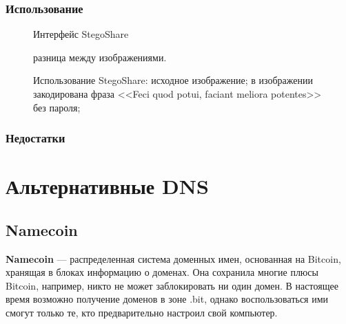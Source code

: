\subsubsection{Использование}
\begin{figure}[h]
\caption{Интерфейс StegoShare}
\end{figure}
\begin{figure}[ht!]
\vspace{-4ex}
\centering
{}
\hspace{4ex}
\hspace{4ex}
\caption{Использование StegoShare:
 исходное изображение;
 в изображении закодирована фраза <<Feci quod potui, faciant meliora potentes>> без пароля;
} разница между изображениями.
\end{figure}
\subsubsection{Недостатки}

\section{Альтернативные DNS}
\subsection{Namecoin}
\textbf{Namecoin} --- распределенная система доменных имен, основанная на Bitcoin, хранящая в блоках информацию о доменах. Она сохранила многие плюсы Bitcoin, например, никто не может заблокировать ни один домен. В настоящее время возможно получение доменов в зоне .bit, однако воспользоваться ими смогут только те, кто предварительно настроил свой компьютер.
